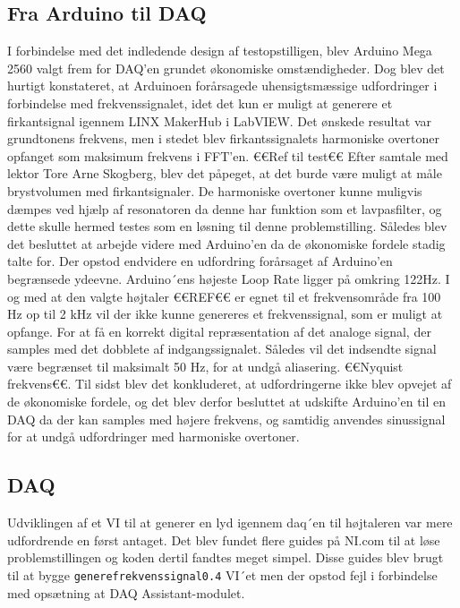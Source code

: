 \subsection{Fra Arduino til DAQ}

I forbindelse med det indledende design af testopstilligen, blev Arduino Mega 2560 valgt frem for DAQ'en grundet økonomiske omstændigheder. Dog blev det hurtigt konstateret, at Arduinoen forårsagede uhensigtsmæssige udfordringer i forbindelse med frekvenssignalet, idet det kun er muligt at generere et firkantsignal igennem LINX MakerHub i LabVIEW. Det ønskede resultat var grundtonens frekvens, men i stedet blev firkantssignalets harmoniske overtoner opfanget som maksimum frekvens i  FFT'en. €€Ref til test€€ Efter samtale med lektor Tore Arne Skogberg, blev det påpeget, at det burde være muligt at måle brystvolumen med firkantsignaler. De harmoniske overtoner kunne muligvis dæmpes ved hjælp af resonatoren da denne har funktion som et lavpasfilter, og dette skulle hermed testes som en løsning til denne problemstilling. Således blev det besluttet at arbejde videre med Arduino'en da de økonomiske fordele stadig talte for. Der opstod endvidere en udfordring forårsaget af Arduino'en begrænsede ydeevne. Arduino´ens højeste Loop Rate ligger på omkring 122Hz. I og med at den valgte højtaler €€REF€€ er egnet til et frekvensområde fra 100 Hz op til 2 kHz vil der ikke kunne genereres et frekvenssignal, som er muligt at opfange. For at få en korrekt digital repræsentation af det analoge signal, der samples med det dobblete af indgangssignalet. Således vil det indsendte signal være begrænset til maksimalt 50 Hz, for at undgå aliasering. €€Nyquist frekvens€€. Til sidst blev det konkluderet, at udfordringerne ikke blev opvejet af de økonomiske fordele, og det blev derfor besluttet at udskifte Arduino'en til en DAQ da der kan samples med højere frekvens, og samtidig anvendes sinussignal for at undgå udfordringer med harmoniske overtoner.      

\subsection{DAQ}

Udviklingen af et VI til at generer en lyd igennem daq´en til højtaleren var mere udfordrende en først antaget. Det blev fundet flere guides på NI.com til at løse problemstillingen og koden dertil fandtes meget simpel. Disse guides blev brugt til at bygge \texttt{generefrekvenssignal0.4} VI´et men der opstod fejl i forbindelse med opsætning at DAQ Assistant-modulet. 

